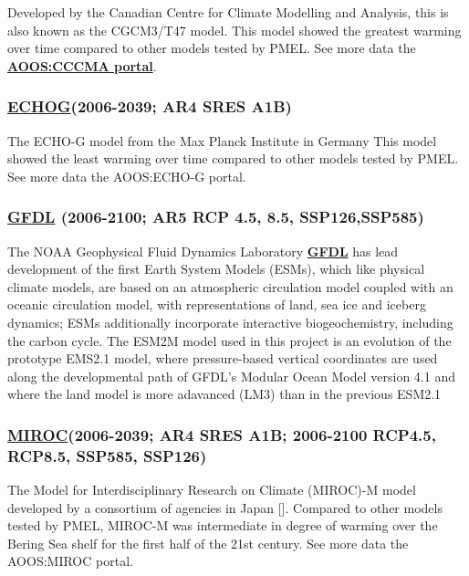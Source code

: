 \documentclass[
]{article}
\begin{document}
Developed by the Canadian Centre for Climate Modelling and Analysis,
this is also known as the CGCM3/T47 model. This model showed the
greatest warming over time compared to other models tested by PMEL. See
more data the
\href{http://portal.aoos.org/bering-sea.php\#module-metadata/4f706756-7d57-11e3-bce5-00219bfe5678/ffa1bcc1-288d-4f8e-912e-500a618b241a}{\textbf{AOOS:CCCMA
portal}}.

\hypertarget{echog2006-2039-ar4-sres-a1b}{%
\subsubsection{\texorpdfstring{\href{http://www-pcmdi.llnl.gov/ipcc/model_documentation/ECHO-G.pdf}{ECHOG}(2006-2039;
AR4 SRES
A1B)}{ECHOG(2006-2039; AR4 SRES A1B)}}\label{echog2006-2039-ar4-sres-a1b}}

The ECHO-G model from the Max Planck Institute in Germany This model
showed the least warming over time compared to other models tested by
PMEL. See more data the AOOS:ECHO-G portal.

\hypertarget{gfdl-2006-2100-ar5-rcp-4.5-8.5-ssp126ssp585}{%
\subsubsection{\texorpdfstring{\href{http://www.gfdl.noaa.gov/earth-system-model}{GFDL}
(2006-2100; AR5 RCP 4.5, 8.5,
SSP126,SSP585)}{GFDL (2006-2100; AR5 RCP 4.5, 8.5, SSP126,SSP585)}}\label{gfdl-2006-2100-ar5-rcp-4.5-8.5-ssp126ssp585}}

The NOAA Geophysical Fluid Dynamics Laboratory
\href{http://www.gfdl.noaa.gov}{\textbf{GFDL}} has lead development of
the first Earth System Models (ESMs), which like physical climate
models, are based on an atmospheric circulation model coupled with an
oceanic circulation model, with representations of land, sea ice and
iceberg dynamics; ESMs additionally incorporate interactive
biogeochemistry, including the carbon cycle. The ESM2M model used in
this project is an evolution of the prototype EMS2.1 model, where
pressure-based vertical coordinates are used along the developmental
path of GFDL's Modular Ocean Model version 4.1 and where the land model
is more adavanced (LM3) than in the previous ESM2.1

\hypertarget{miroc2006-2039-ar4-sres-a1b-2006-2100-rcp4.5-rcp8.5-ssp585-ssp126}{%
\subsubsection{\texorpdfstring{\href{www.cger.nies.go.jp/publications/report/i073/I073.pdf}{MIROC}(2006-2039;
AR4 SRES A1B; 2006-2100 RCP4.5, RCP8.5, SSP585,
SSP126)}{MIROC(2006-2039; AR4 SRES A1B; 2006-2100 RCP4.5, RCP8.5, SSP585, SSP126)}}\label{miroc2006-2039-ar4-sres-a1b-2006-2100-rcp4.5-rcp8.5-ssp585-ssp126}}

The Model for Interdisciplinary Research on Climate (MIROC)-M model
developed by a consortium of agencies in Japan {[}{]}. Compared to other
models tested by PMEL, MIROC-M was intermediate in degree of warming
over the Bering Sea shelf for the first half of the 21st century. See
more data the AOOS:MIROC portal.
\end{document}
